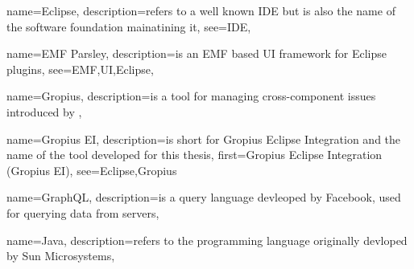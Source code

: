 
{
	name=Eclipse,
	description={refers to a well known IDE but is also the name of the software foundation mainatining it},
	see={IDE},
}



{
	name={EMF Parsley},
	description={is an EMF based UI framework for Eclipse plugins},
	see={EMF,UI,Eclipse},
}

{
	name=Gropius,
	description={is a tool for managing cross-component issues introduced by \cite{speth2020gropius}},
}


{
	name=Gropius EI,
	description={is short for Gropius Eclipse Integration and the name of the tool developed for this thesis},
	first={Gropius Eclipse Integration (Gropius EI)},
	see={Eclipse,Gropius}
}

{
	name=GraphQL,
	description={is a query language devleoped by Facebook, used for querying data from servers},
}

{
	name=Java,
	description={refers to the programming language originally devloped by Sun Microsystems},
}